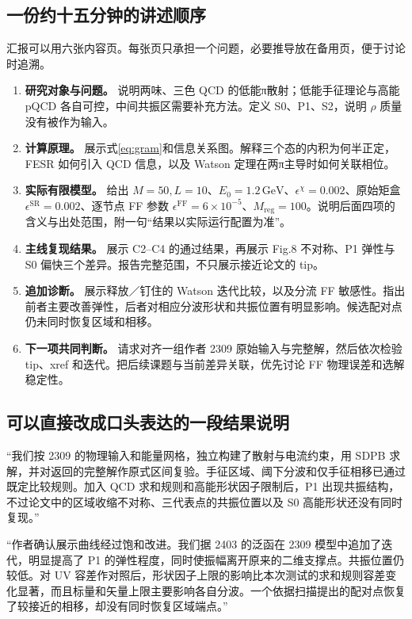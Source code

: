 \documentclass[UTF8,a4paper,11pt,fontset=fandol]{ctexart}
\numberwithin{equation}{section}
\newcommand{\GeV}{\,\mathrm{GeV}}
\newcommand{\eChi}{\epsilon^{\chi}}
\newcommand{\eSR}{\epsilon^{\mathrm{SR}}}
\newcommand{\eFF}{\epsilon^{\mathrm{FF}}}
\newcommand{\Mreg}{M_{\mathrm{reg}}}
\begin{document}
\subsection{一份约十五分钟的讲述顺序}
汇报可以用六张内容页。每张页只承担一个问题，必要推导放在备用页，便于讨论时追溯。

\begin{enumerate}
\item \textbf{研究对象与问题。} 说明两味、三色 QCD 的低能π散射；低能手征理论与高能 pQCD 各自可控，中间共振区需要补充方法。定义 S0、P1、S2，说明 \(\rho\) 质量没有被作为输入。
\item \textbf{计算原理。} 展示式\eqref{eq:gram}和信息关系图。解释三个态的内积为何半正定，FESR 如何引入 QCD 信息，以及 Watson 定理在两π主导时如何关联相位。
\item \textbf{实际有限模型。} 给出 \(M=50,L=10\)、\(E_0=1.2\GeV\)、\(\eChi=0.002\)、原始矩盒 \(\eSR=0.002\)、逐节点 FF 参数 \(\eFF=6\times10^{-5}\)、\(\Mreg=100\)。说明后面四项的含义与出处范围，附一句“结果以实际运行配置为准”。
\item \textbf{主线复现结果。} 展示 C2--C4 的通过结果，再展示 Fig.8 不对称、P1 弹性与 S0 偏快三个差异。报告完整范围，不只展示接近论文的 tip。
\item \textbf{追加诊断。} 展示释放／钉住的 Watson 迭代比较，以及分流 FF 敏感性。指出前者主要改善弹性，后者对相应分波形状和共振位置有明显影响。候选配对点仍未同时恢复区域和相移。
\item \textbf{下一项共同判断。} 请求对齐一组作者 2309 原始输入与完整解，然后依次检验 tip、xref 和迭代。把后续课题与当前差异关联，优先讨论 FF 物理误差和选解稳定性。
\end{enumerate}

\subsection{可以直接改成口头表达的一段结果说明}
“我们按 2309 的物理输入和能量网格，独立构建了散射与电流约束，用 SDPB 求解，并对返回的完整解作原式区间复验。手征区域、阈下分波和仅手征相移已通过既定比较规则。加入 QCD 求和规则和高能形状因子限制后，P1 出现共振结构，不过论文中的区域收缩不对称、三代表点的共振位置以及 S0 高能形状还没有同时复现。”

“作者确认展示曲线经过饱和改进。我们据 2403 的泛函在 2309 模型中追加了迭代，明显提高了 P1 的弹性程度，同时使振幅离开原来的二维支撑点。共振位置仍较低。对 UV 容差作对照后，形状因子上限的影响比本次测试的求和规则容差变化显著，而且标量和矢量上限主要影响各自分波。一个依据扫描提出的配对点恢复了较接近的相移，却没有同时恢复区域端点。”
\end{document}
